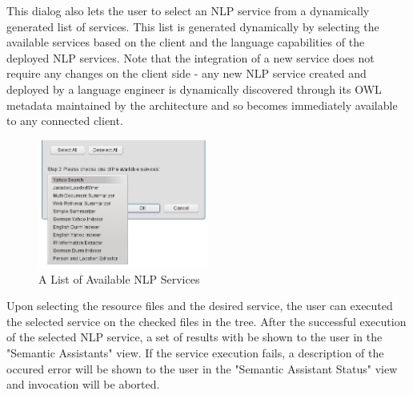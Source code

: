 This dialog also lets the user to select an NLP service from a dynamically
generated list of services. This list is generated dynamically by selecting the
available services based on the client and the language capabilities of the
deployed NLP services. Note that the integration of a new service does not
require any changes on the client side - any new NLP service created and
deployed by a language engineer is dynamically discovered through its OWL
metadata maintained by the architecture and so becomes immediately available to
any connected client.

\begin{figure}[htb]
\begin{center}
  \includegraphics[width=0.5\textwidth]{pictures/eclipse_services.jpg}
  \caption{A List of Available NLP Services}
  \label{fig:eclipse_services}
\end{center}
\end{figure}

Upon selecting the resource files and the desired service, the user can executed
the selected service on the checked files in the tree. After the successful
execution of the selected NLP service, a set of results with be shown to the
user in the "Semantic Assistants" view. If the service execution fails, a
description of the occured error will be shown to the user in the "Semantic
Assistant Status" view and invocation will be aborted.

